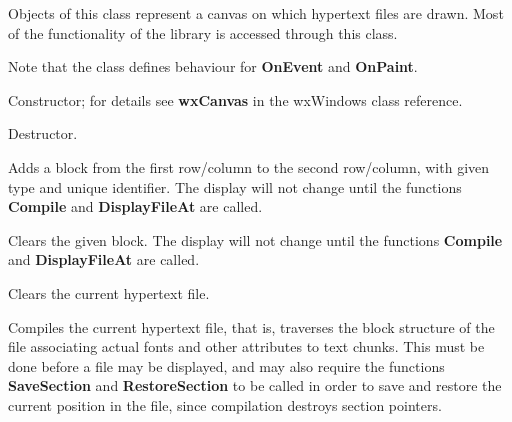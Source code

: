 Objects of this class represent a canvas on which hypertext files are
drawn.  Most of the functionality of the library is accessed through
this class.

Note that the class defines behaviour for {\bf OnEvent} and {\bf OnPaint}.



Constructor; for details see {\bf wxCanvas} in the wxWindows class reference.



Destructor.



Adds a block from the first row/column to the second row/column, with
given type and unique identifier. The display will not change until
the functions {\bf Compile} and {\bf DisplayFileAt} are called.



Clears the given block. The display will not change until the
functions {\bf Compile} and {\bf DisplayFileAt} are called.



Clears the current hypertext file.



Compiles the current hypertext file, that is, traverses the block
structure of the file associating actual fonts and other attributes to
text chunks. This must be done before a file may be displayed, and may
also require the functions {\bf SaveSection} and {\bf RestoreSection}
to be called in order to save and restore the current position in the
file, since compilation destroys section pointers.

